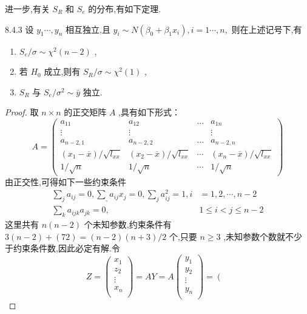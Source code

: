 进一步,有关 $ S_R $ 和 $ S_e $ 的分布,有如下定理.
\begin{theorem}{}{8.4.3}
	设 $ y_1\cdots,y_n $ 相互独立,且 $ y_i\sim N(\beta_0+\beta_1x_i),i=1\cdots,n, $ 则在上述记号下,有
	\begin{enumerate}
		\item  $ S_e/\sigma\sim \chi^2(n-2) $ ,
		\item 若 $ H_0 $ 成立,则有 $ S_R/\sigma\sim \chi^2(1) $ ,
		\item  $ S_R $ 与 $ S_e/\sigma^2\sim \bar{y} $ 独立.
	\end{enumerate}
\end{theorem}
\begin{proof}{}{}
	取 $ n \times n $ 的正交矩阵 $ A $ ,具有如下形式：
	\[
	A=\left(\begin{array}{cccc}{a_{11}} & {a_{12}} & {\dots} & {a_{1 n}} \\ {\vdots} & {\vdots} & {} & {\vdots} \\ {a_{n-2,1}} & {a_{n-2,2}} & {\dots} & {a_{n-2, n}} \\ {\left(x_{1}-\overline{x}\right) / \sqrt{l_{x x}}} & {\left(x_{2}-\overline{x}\right) / \sqrt{l_{x x}}} & {\cdots} & {\left(x_{n}-\overline{x}\right) / \sqrt{l_{x x}}} \\ {1 / \sqrt{n}} & {1 / \sqrt{n}} & {\cdots} & {1 / \sqrt{n}}\end{array}\right)
	\]
	由正交性,可得如下一些约束条件
	\[
	\begin{aligned} 
	\sum_{j} a_{i j}=0, \sum_{,} a_{i j} x_{j}=0, \sum_{j} a_{i j}^{2}=1, i &=1,2, \cdots, n-2 \\ 
	\sum_{k} a_{i j k} a_{j k}=0, & 1 \leqslant i<j \leqslant n-2 
	\end{aligned}
	\]
	这里共有 $ n(n-2) $ 个未知参数,约束条件有 $ 3(n-2)+(72)=(n-2)(n+
	3)/2 $ 个,只要 $ n\ge 3 $ ,未知参数个数就不少于约束条件数,因此必定有解.令
	\[
	Z=\left( \begin{array}{c}
	x_1\\
	z_2\\
	\vdots\\
	x_n\\
	\end{array} \right) =AY=A\left( \begin{array}{c}
	y_1\\
	y_2\\
	\vdots\\
	y_n\\
	\end{array} \right) =\left( \begin{array}{c}

\end{array}\]
\end{proof}
